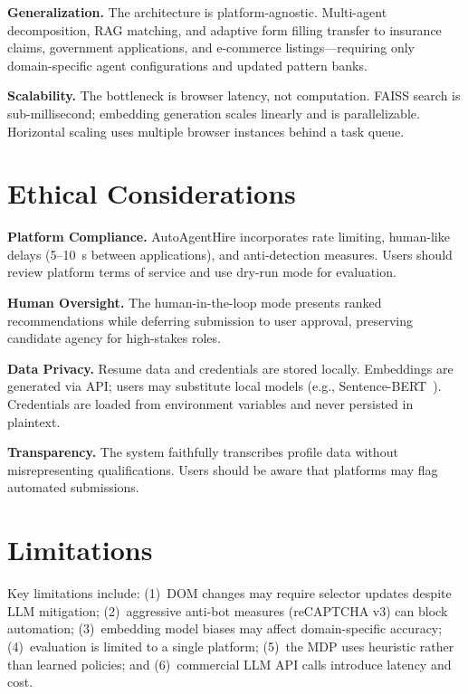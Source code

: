 \documentclass[conference]{IEEEtran}
\begin{document}
\textbf{Generalization.} The architecture is platform-agnostic. Multi-agent decomposition, RAG matching, and adaptive form filling transfer to insurance claims, government applications, and e-commerce listings---requiring only domain-specific agent configurations and updated pattern banks.

\textbf{Scalability.} The bottleneck is browser latency, not computation. FAISS search is sub-millisecond; embedding generation scales linearly and is parallelizable. Horizontal scaling uses multiple browser instances behind a task queue.

\section{Ethical Considerations}

\textbf{Platform Compliance.} AutoAgentHire incorporates rate limiting, human-like delays (5--10~s between applications), and anti-detection measures. Users should review platform terms of service and use dry-run mode for evaluation.

\textbf{Human Oversight.} The human-in-the-loop mode presents ranked recommendations while deferring submission to user approval, preserving candidate agency for high-stakes roles.

\textbf{Data Privacy.} Resume data and credentials are stored locally. Embeddings are generated via API; users may substitute local models (e.g., Sentence-BERT~\cite{reimers2019sentence}). Credentials are loaded from environment variables and never persisted in plaintext.

\textbf{Transparency.} The system faithfully transcribes profile data without misrepresenting qualifications. Users should be aware that platforms may flag automated submissions.

\section{Limitations}

Key limitations include: (1)~DOM changes may require selector updates despite LLM mitigation; (2)~aggressive anti-bot measures (reCAPTCHA v3) can block automation; (3)~embedding model biases may affect domain-specific accuracy; (4)~evaluation is limited to a single platform; (5)~the MDP uses heuristic rather than learned policies; and (6)~commercial LLM API calls introduce latency and cost.
\end{document}
